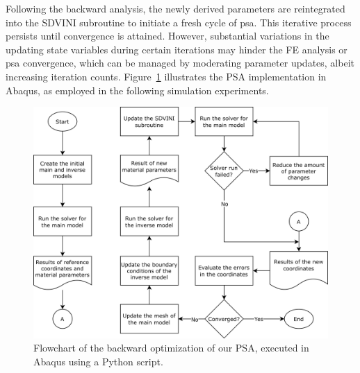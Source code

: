 \documentclass[12pt,a4paper]{report}
\begin{document}
Following the backward analysis, the newly derived parameters are reintegrated into the SDVINI subroutine to initiate a fresh cycle of \ac{psa}. This iterative process persists until convergence is attained. However, substantial variations in the updating state variables during certain iterations may hinder the FE analysis or \ac{psa} convergence, which can be managed by moderating parameter updates, albeit increasing iteration counts. Figure~\ref{fig:psa_run} illustrates the PSA implementation in Abaqus, as employed in the following simulation experiments.

\begin{figure}[t]\centering
\includegraphics[width=\textwidth]{img/psa_run.png}
\caption{Flowchart of the backward optimization of our PSA, executed in Abaqus using a Python script.}
\label{fig:psa_run}
\end{figure}
\end{document}
